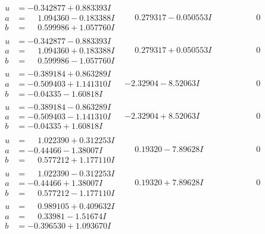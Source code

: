 \documentclass[1p]{elsarticle_modified}
\theoremstyle{definition}
\begin{document}
$$\begin{array}{c|c|c}
\begin{aligned}
u &= -0.342877 + 0.883393 I \\
a &= \phantom{-}1.094360 - 0.183388 I \\
b &= \phantom{-}0.599986 + 1.057760 I\end{aligned}
 & \phantom{-}0.279317 - 0.050553 I & \phantom{-0.000000 } 0 \\ \hline\begin{aligned}
u &= -0.342877 - 0.883393 I \\
a &= \phantom{-}1.094360 + 0.183388 I \\
b &= \phantom{-}0.599986 - 1.057760 I\end{aligned}
 & \phantom{-}0.279317 + 0.050553 I & \phantom{-0.000000 } 0 \\ \hline\begin{aligned}
u &= -0.389184 + 0.863289 I \\
a &= -0.509403 + 1.141310 I \\
b &= -0.04335 - 1.60818 I\end{aligned}
 & -2.32904 - 8.52063 I & \phantom{-0.000000 } 0 \\ \hline\begin{aligned}
u &= -0.389184 - 0.863289 I \\
a &= -0.509403 - 1.141310 I \\
b &= -0.04335 + 1.60818 I\end{aligned}
 & -2.32904 + 8.52063 I & \phantom{-0.000000 } 0 \\ \hline\begin{aligned}
u &= \phantom{-}1.022390 + 0.312253 I \\
a &= -0.44466 - 1.38007 I \\
b &= \phantom{-}0.577212 + 1.177110 I\end{aligned}
 & \phantom{-}0.19320 - 7.89628 I & \phantom{-0.000000 } 0 \\ \hline\begin{aligned}
u &= \phantom{-}1.022390 - 0.312253 I \\
a &= -0.44466 + 1.38007 I \\
b &= \phantom{-}0.577212 - 1.177110 I\end{aligned}
 & \phantom{-}0.19320 + 7.89628 I & \phantom{-0.000000 } 0 \\ \hline\begin{aligned}
u &= \phantom{-}0.989105 + 0.409632 I \\
a &= \phantom{-}0.33981 - 1.51674 I \\
b &= -0.396530 + 1.093670 I\end{aligned}

\end{array}$$
\end{document}
